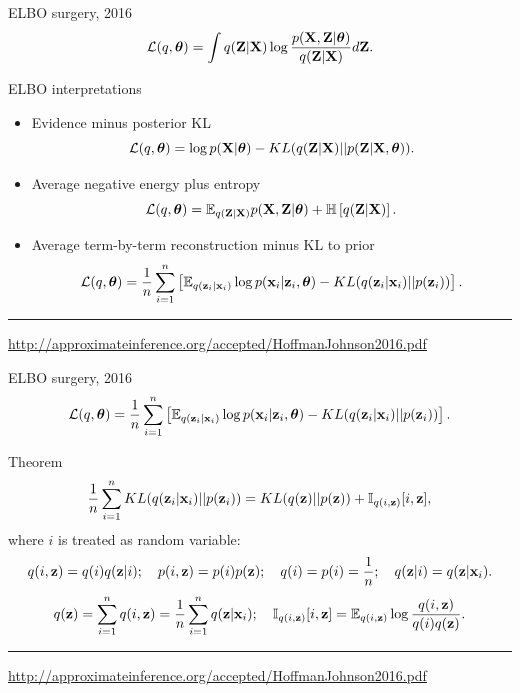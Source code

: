 \documentclass{beamer}
\begin{document}
\begin{frame}{ELBO surgery, 2016}
		\[
			\mathcal{L} (q, \boldsymbol{\theta})  = \int q(\mathbf{Z} | \mathbf{X}) \log \frac{p(\mathbf{X}, \mathbf{Z} | \boldsymbol{\theta})}{q(\mathbf{Z} | \mathbf{X})} d\mathbf{Z}.
		\]
		\vspace{-0.1cm}
	\begin{block}{ELBO interpretations}
	\begin{itemize}
	    \item Evidence minus posterior KL
	    \vspace{-0.1cm}
	    \[
	        \mathcal{L}(q, \boldsymbol{\theta}) = \log p(\mathbf{X} | \boldsymbol{\theta}) - KL(q(\mathbf{Z} | \mathbf{X}) || p(\mathbf{Z} | \mathbf{X}, \boldsymbol{\theta})).
	    \]
	    \item Average negative energy plus entropy
	    \vspace{-0.1cm}
	    \[
	        \mathcal{L}(q, \boldsymbol{\theta}) = \mathbb{E}_{q(\mathbf{Z} | \mathbf{X})} p(\mathbf{X}, \mathbf{Z} | \boldsymbol{\theta}) + \mathbb{H} \left[q(\mathbf{Z} | \mathbf{X}) \right].
	    \]
	    \item Average term-by-term reconstruction minus KL to prior
	    \vspace{-0.1cm}
	    \[
	        \mathcal{L}(q, \boldsymbol{\theta}) = \frac{1}{n} \sum_{i=1}^n \left[ \mathbb{E}_{q(\mathbf{z}_i | \mathbf{x}_i)} \log p(\mathbf{x}_i | \mathbf{z}_i, \boldsymbol{\theta}) - KL(q(\mathbf{z}_i | \mathbf{x}_i) || p(\mathbf{z}_i)) \right].
	    \]
	\end{itemize}
	\end{block}
	
	\vfill
	\hrule\medskip
	{\scriptsize \href{http://approximateinference.org/accepted/HoffmanJohnson2016.pdf}{http://approximateinference.org/accepted/HoffmanJohnson2016.pdf}}
\end{frame}
\begin{frame}{ELBO surgery, 2016}
\vspace{-0.3cm}
\[
    \mathcal{L}(q, \boldsymbol{\theta}) = \frac{1}{n} \sum_{i=1}^n \left[ \mathbb{E}_{q(\mathbf{z}_i | \mathbf{x}_i)} \log p(\mathbf{x}_i | \mathbf{z}_i, \boldsymbol{\theta}) - KL(q(\mathbf{z}_i | \mathbf{x}_i) || p(\mathbf{z}_i)) \right].
\]
\vspace{-0.3cm}
\begin{block}{Theorem}
\[
    \frac{1}{n} \sum_{i=1}^n KL(q(\mathbf{z}_i | \mathbf{x}_i) || p(\mathbf{z}_i)) = KL(q(\mathbf{z}) || p(\mathbf{z})) + \mathbb{I}_{q(i, \mathbf{z})} [i, \mathbf{z}],
\]
where $i$ is treated as random variable:
\footnotesize{
\[
    q(i, \mathbf{z}) = q(i) q(\mathbf{z} | i); \quad p(i, \mathbf{z}) = p(i) p(\mathbf{z}); \quad 
    q(i) = p(i) = \frac{1}{n}; \quad q(\mathbf{z} | i) = q(\mathbf{z} | \mathbf{x}_i).
\]
\[
    q(\mathbf{z}) = \sum_{i=1}^n q(i, \mathbf{z}) = \frac{1}{n} \sum_{i=1}^n q(\mathbf{z} | \mathbf{x}_i); \quad  \mathbb{I}_{q(i, \mathbf{z})} [i, \mathbf{z}] = \mathbb{E}_{q(i, \mathbf{z})} \log \frac{q(i, \mathbf{z})}{q(i)q(\mathbf{z})}.
\]
}
\end{block}

\vfill
\hrule\medskip
{\scriptsize \href{http://approximateinference.org/accepted/HoffmanJohnson2016.pdf}{http://approximateinference.org/accepted/HoffmanJohnson2016.pdf}}
\end{frame}
\end{document}
